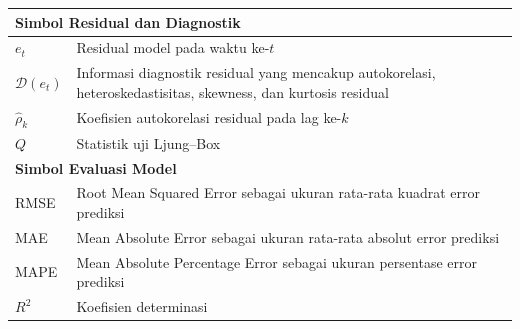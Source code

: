 \begin{longtable}{p{2.8cm} p{10.8cm}}
\multicolumn{2}{l}{\bfseries Simbol Residual dan Diagnostik} \\ \hline
$e_t$ & Residual model pada waktu ke-$t$ \\
$\mathcal{D}(e_t)$ & Informasi diagnostik residual yang mencakup autokorelasi, heteroskedastisitas, skewness, dan kurtosis residual \\
$\hat{\rho}_k$ & Koefisien autokorelasi residual pada lag ke-$k$ \\
$Q$ & Statistik uji Ljung--Box \\

\multicolumn{2}{l}{\bfseries Simbol Evaluasi Model} \\ \hline
RMSE & Root Mean Squared Error sebagai ukuran rata-rata kuadrat error prediksi \\
MAE & Mean Absolute Error sebagai ukuran rata-rata absolut error prediksi \\
MAPE & Mean Absolute Percentage Error sebagai ukuran persentase error prediksi \\
$R^2$ & Koefisien determinasi \\

\end{longtable}
